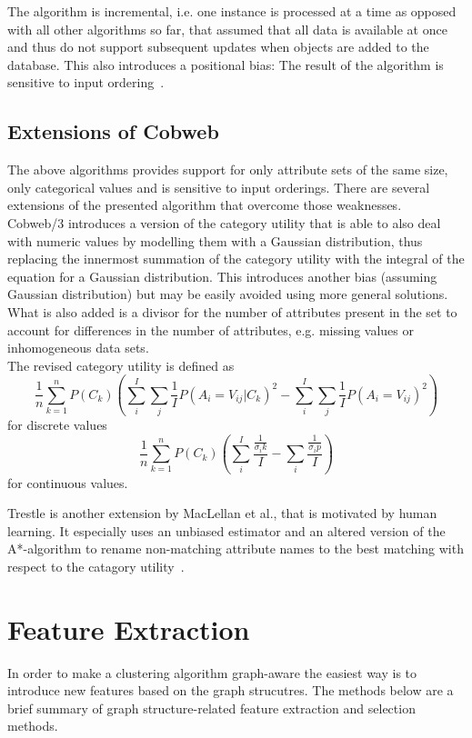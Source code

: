 The algorithm is incremental, i.e. one instance is processed at a time as opposed with all other algorithms so far, that assumed that all data is available at once and thus do not support subsequent updates when objects are added to the database. This also introduces a positional bias: The result of the algorithm is sensitive to input ordering~\cite{classit}. \\

\subsection{Extensions of Cobweb}\label{\positionnumber}
The above algorithms provides support for only attribute sets of the same size, only categorical values and is sensitive to input orderings. There are several extensions of the presented algorithm that overcome those weaknesses. \\

Cobweb/3 introduces a version of the category utility that is able to also deal with numeric values by modelling them with a Gaussian distribution, thus replacing the innermost summation of the category utility with the integral of the equation for a Gaussian distribution. This introduces another bias (assuming Gaussian distribution) but may be easily avoided using more general solutions. What is also added is a divisor for the number of attributes present in the set to account for differences in the number of attributes, e.g. missing values or inhomogeneous data sets. \\
The revised category utility is defined as   \[ \frac{1}{n} \sum_{k = 1}^n P(C_k) ( \sum_i^I \sum_j \frac{1}{I} P(A_i = V_{ij}| C_k)^2 - \sum_i^I \sum_j \frac{1}{I} P(A_i = V_{ij})^2) \] for discrete values 
\[ \frac{1}{n} \sum_{k = 1}^n P(C_k) ( \sum_i^I \frac{\frac{1}{\sigma_ik}}{I} - \sum_i \frac{\frac{1}{\sigma_ip}}{I}) \] 
for continuous values.

Trestle is another extension by MacLellan et al., that is motivated by human learning. It especially uses an unbiased estimator and an altered version of the A*-algorithm to rename non-matching attribute names to the best matching with respect to the catagory utility~\cite{maclellan2016trestle}.

\section{Feature Extraction}\label{\positionnumber}
In order to make a clustering algorithm graph-aware the easiest way is to introduce new features based on the graph strucutres. The methods below are a brief summary of graph structure-related feature extraction and selection methods. \\

